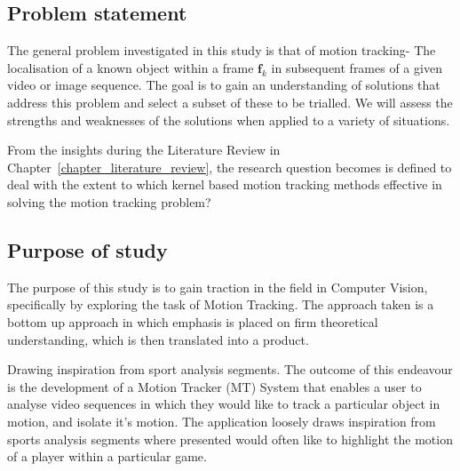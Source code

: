 \subsection{Problem statement}\label{introduction_problem}
The general problem investigated in this study is that of motion tracking- The
localisation of a known object within a frame $\mathbf{f}_k$ in subsequent
frames of a given video or image sequence.  
The goal is to gain an understanding of solutions that address this problem and
select a subset of these to be trialled. We will assess the strengths and
weaknesses of the solutions when applied to a variety of situations.

From the insights during the Literature Review in Chapter~\ref{chapter_literature_review}, the
research question becomes is defined to deal with the extent to which kernel based motion tracking
methods effective in solving the motion tracking problem?

\subsection{Purpose of study}\label{introduction_purpose}
The purpose of this study is to gain traction in the field in Computer Vision,
specifically by exploring the task of Motion Tracking. The approach taken is a
bottom up approach in which emphasis is placed on firm theoretical
understanding, which is then translated into a product.

Drawing inspiration from sport analysis segments. The outcome of this endeavour
is the development of a Motion Tracker (MT) System that enables a user to
analyse video sequences in which they would like to track a particular object in
motion, and isolate it's motion. The application loosely draws inspiration from
sports analysis segments where presented would often like to highlight the
motion of a player within a particular game.

